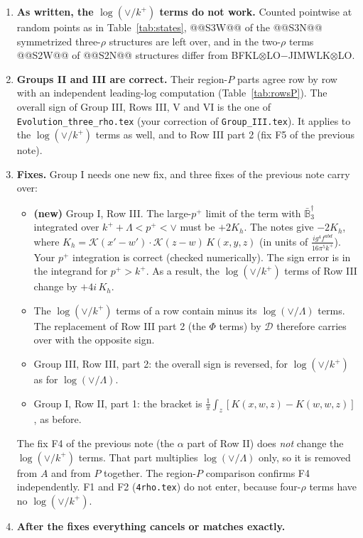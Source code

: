 \documentclass[10pt]{article}
\numberwithin{equation}{section}
\newcommand{\KK}{\mathcal K}
\newcommand{\kp}{k^+}
\newcommand{\pp}{p^+}
\begin{document}
\begin{enumerate}
\item \textbf{As written, the $\log(\vee/k^+)$ terms do not work.} Counted pointwise at random points as in Table~\ref{tab:states}, @@S3W@@ of the @@S3N@@ symmetrized three-$\rho$ structures are left over, and in the two-$\rho$ terms @@S2W@@ of @@S2N@@ structures differ from BFKL$\otimes$LO$-$JIMWLK$\otimes$LO.
\item \textbf{Groups II and III are correct.} Their region-$P$ parts agree row by row with an independent leading-log computation (Table~\ref{tab:rowsP}). The overall sign of Group III, Rows III, V and VI is the one of \texttt{Evolution\_three\_rho.tex} (your correction of \texttt{Group\_III.tex}). It applies to the $\log(\vee/k^+)$ terms as well, and to Row III part 2 (fix F5 of the previous note).
\item \textbf{Fixes.} Group I needs one new fix, and three fixes of the previous note carry over:
\begin{itemize}
\item[P1] \textbf{(new)} Group I, Row III. The large-$\pp$ limit of the term with $\bar{\mathbb B}_3^\dagger$ integrated over $\kp+\Lambda<\pp<\vee$ must be $+2K_h$. The notes give $-2K_h$, where $K_h=\KK(x'-w')\cdot\KK(z-w)\,K(x,y,z)$ (in units of $\frac{ig^4f^{abd}}{16\pi^5k^+}$). Your $\pp$ integration is correct (checked numerically). The sign error is in the integrand for $\pp>\kp$. As a result, the $\log(\vee/k^+)$ terms of Row III change by $+4i\,K_h$.
\item[F3] The $\log(\vee/k^+)$ terms of a row contain minus its $\log(\vee/\Lambda)$ terms. The replacement of Row III part 2 (the $\Phi$ terms) by $\mathcal D$ therefore carries over with the opposite sign.
\item[F5] Group III, Row III, part 2: the overall sign is reversed, for $\log(\vee/k^+)$ as for $\log(\vee/\Lambda)$.
\item[F6] Group I, Row II, part 1: the bracket is $\frac1\pi\int_z[K(x,w,z)-K(w,w,z)]$, as before.
\end{itemize}
The fix F4 of the previous note (the $\alpha$ part of Row II) does \emph{not} change the $\log(\vee/k^+)$ terms. That part multiplies $\log(\vee/\Lambda)$ only, so it is removed from $A$ and from $P$ together. The region-$P$ comparison confirms F4 independently. F1 and F2 (\texttt{4rho.tex}) do not enter, because four-$\rho$ terms have no $\log(\vee/k^+)$.
\item \textbf{After the fixes everything cancels or matches exactly.}
\begin{itemize}

\end{itemize}
\end{enumerate}
\end{document}
